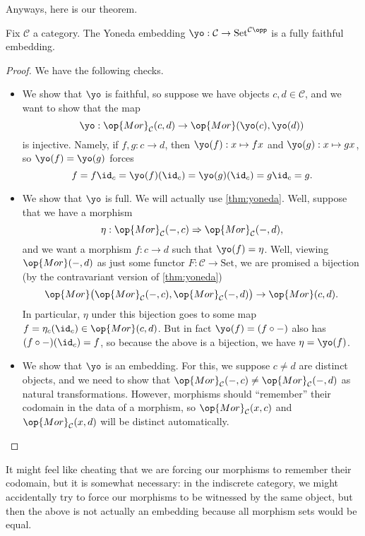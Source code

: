 \documentclass[../notes.tex]{subfiles}
\begin{document}
Anyways, here is our theorem.
\begin{theorem} \label{thm:yonedaembedding}
	Fix $\mathcal C$ a category. The Yoneda embedding $\yo:\mathcal C\to\mathrm{Set}^{\mathcal C\opp}$ is a fully faithful embedding.
\end{theorem}
\begin{proof}
	We have the following checks.
	\begin{itemize}
		\item We show that $\yo$ is faithful, so suppose we have objects $c,d\in\mathcal C$, and we want to show that the map
		\[\yo:\op{Mor}_\mathcal C(c,d)\to\op{Mor}(\yo(c),\yo(d))\]
		is injective. Namely, if $f,g:c\to d$, then $\yo(f):x\mapsto fx$ and $\yo(g):x\mapsto gx$, so $\yo(f)=\yo(g)$ forces
		\[f=f\id_c=\yo(f)(\id_c)=\yo(g)(\id_c)=g\id_c=g.\]
		\item We show that $\yo$ is full. We will actually use \autoref{thm:yoneda}. Well, suppose that we have a morphism
		\[\eta:\op{Mor}_\mathcal C(-,c)\Rightarrow\op{Mor}_\mathcal C(-,d),\]
		and we want a morphism $f:c\to d$ such that $\yo(f)=\eta$. Well, viewing $\op{Mor}(-,d)$ as just some functor $F:\mathcal C\to\mathrm{Set}$, we are promised a bijection (by the contravariant version of \autoref{thm:yoneda})
		\[\op{Mor}\big(\op{Mor}_\mathcal C(-,c),\op{Mor}_\mathcal C(-,d)\big)\to\op{Mor}(c,d).\]
		In particular, $\eta$ under this bijection goes to some map $f=\eta_c(\id_c)\in\op{Mor}(c,d)$. But in fact $\yo(f)=(f\circ-)$ also has $(f\circ-)(\id_c)=f$, so because the above is a bijection, we have $\eta=\yo(f)$.
		\item We show that $\yo$ is an embedding. For this, we suppose $c\ne d$ are distinct objects, and we need to show that $\op{Mor}_\mathcal C(-,c)\ne\op{Mor}_\mathcal C(-,d)$ as natural transformations. However, morphisms should ``remember'' their codomain in the data of a morphism, so $\op{Mor}_\mathcal C(x,c)$ and $\op{Mor}_\mathcal C(x,d)$ will be distinct automatically.
		\qedhere
	\end{itemize}
\end{proof}
It might feel like cheating that we are forcing our morphisms to remember their codomain, but it is somewhat necessary: in the indiscrete category, we might accidentally try to force our morphisms to be witnessed by the same object, but then the above is not actually an embedding because all morphism sets would be equal.
\end{document}
